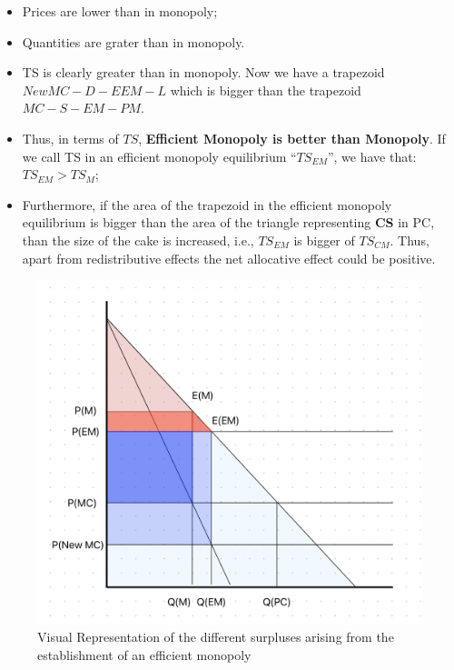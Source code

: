             \begin{itemize}
                \item Prices are lower than in monopoly; 
                \item Quantities are grater than in monopoly.
                \item TS is clearly greater than in monopoly. Now we have a trapezoid $NewMC-D-EEM-L$ which is bigger than the trapezoid $MC-S-EM-PM$.
                \item Thus, in terms of $TS$, \textbf{Efficient Monopoly is better than Monopoly}. If we call TS in an efficient monopoly equilibrium “$TS_{EM}$”, we have that: $TS_{EM} > TS_{M}$;
                \item Furthermore, if the area of the trapezoid in the efficient monopoly equilibrium is bigger than the area of the triangle representing \textcolor{BrickRed}{\textbf{CS}} in PC, than the size of the cake is increased, i.e., $TS_{EM}$ is bigger of $TS_{CM}$. Thus, apart from redistributive effects the net allocative effect could be positive.
            \end{itemize}

            \begin{figure}[h]
                \centering
                \includegraphics[width=0.66\linewidth]{graphics/L3-2_EfficientMonopoly.png}
                \caption{Visual Representation of the different surpluses arising from the establishment of an efficient monopoly}
                \label{fig:efficient_monopoly}
            \end{figure}

